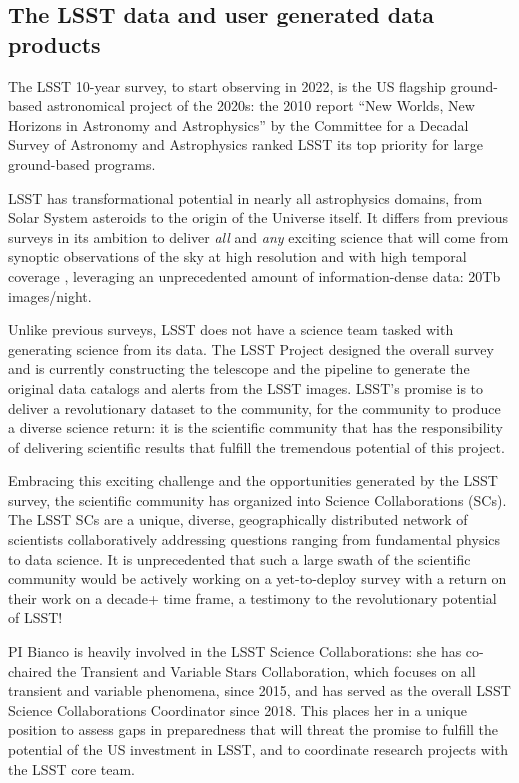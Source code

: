 \documentclass{proposalnsf}
\begin{document}
\subsection{The LSST data and user generated data products}


The LSST 10-year survey, to start observing in 2022, is the US flagship ground-based astronomical project of the 2020s: the 2010 report “New Worlds, New Horizons in Astronomy and Astrophysics” \citep{NAP12951} by the Committee for a Decadal Survey of Astronomy and Astrophysics ranked LSST its top priority for large ground-based programs. 

LSST has transformational potential in nearly all astrophysics domains, from Solar System asteroids to the origin of the Universe itself. It differs from previous surveys in its ambition to deliver \emph{all} and \emph{any} exciting science that will come from synoptic observations of the sky at high resolution and with high temporal coverage \citep{Ivezic2019}, leveraging an unprecedented amount of information-dense data: 20Tb images/night. 

Unlike previous surveys, LSST does not have a science team tasked with generating
science from its data. The LSST Project designed the overall survey and is currently
constructing the telescope and the pipeline to generate the original data catalogs and
alerts from the LSST images. LSST’s promise is to deliver a revolutionary dataset to the community, for the community to produce a diverse science return: it is the scientific community that has the responsibility
of delivering scientific results that fulfill the tremendous potential of this project. 

Embracing this exciting challenge and the opportunities generated by the LSST survey,
the scientific community has organized into Science Collaborations (SCs). The LSST
SCs are a unique, diverse, geographically distributed network of scientists
collaboratively addressing questions ranging from fundamental physics to data
science. It is unprecedented that such a large swath of the scientific community would
be actively working on a yet-to-deploy survey with a return on their work on a decade+
time frame, a testimony to the
revolutionary potential of LSST!

PI Bianco is heavily involved in the LSST Science Collaborations: she has co-chaired the Transient and Variable Stars Collaboration, which focuses on all transient and variable phenomena, since 2015, and has served as the overall LSST Science Collaborations Coordinator since 2018. This places her in a unique position to assess gaps in preparedness that will threat the promise to fulfill the potential of the US investment in LSST, and to coordinate research projects with the LSST core team. 
\end{document}

